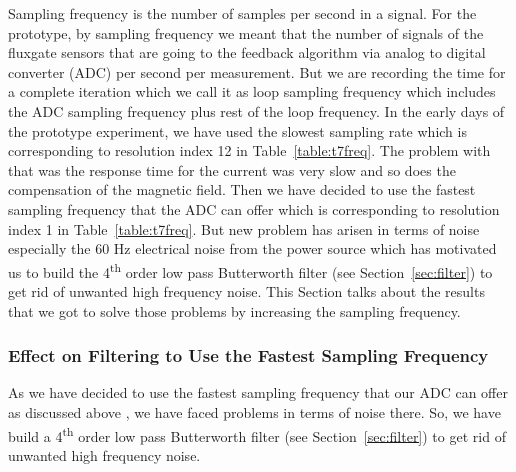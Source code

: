 Sampling frequency is the number of samples per second in a signal. For the prototype, by sampling frequency we meant that the number of signals of the fluxgate sensors that are going to the feedback algorithm via analog to digital converter (ADC) per second per measurement. But we are recording the time for a complete iteration which we call it as loop sampling frequency which includes the ADC sampling frequency plus rest of the loop frequency. In the early days of the prototype experiment, we have used the slowest sampling rate which is corresponding to resolution index 12 in Table~\ref{table:t7freq}.  The problem with that was the response time for the current was very slow and so does the compensation of the magnetic field. Then we have decided to use the fastest sampling frequency that the ADC can offer which is corresponding to resolution index 1 in Table~\ref{table:t7freq}. But new problem has arisen in terms of noise especially the 60 Hz electrical noise from the power source which has motivated us to build the 4\textsuperscript{th} order low pass Butterworth filter (see Section~\ref{sec:filter}) to get rid of unwanted high frequency noise. This Section talks about the results that we got to solve those problems by increasing the sampling frequency.

\subsubsection{Effect on Filtering to Use the Fastest Sampling Frequency}

As we have decided to use the fastest sampling frequency that our ADC can offer as discussed above , we have faced problems in terms of noise there. So, we have build a 4\textsuperscript{th} order low pass Butterworth filter (see Section~\ref{sec:filter}) to get rid of unwanted high frequency noise. 


